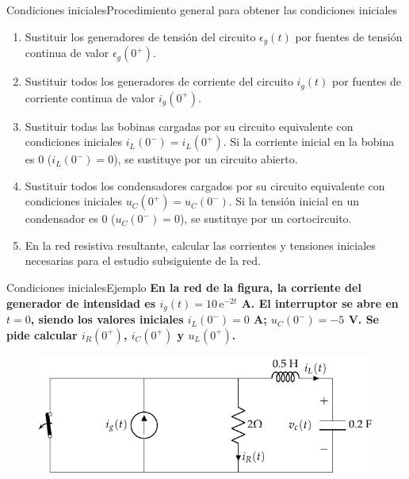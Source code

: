\documentclass[aspectratio=169, xcolor={usenames,svgnames,dvipsnames}]{beamer}
\begin{document}
\begin{frame}{Condiciones iniciales}{Procedimiento general para obtener las condiciones iniciales}

	\begin{enumerate}
		\item Sustituir los generadores de tensión del circuito $\epsilon_g(t)$ por fuentes de tensión continua de valor $\epsilon_g(0^+)$.
		\item Sustituir todos los generadores de corriente del circuito $i_g(t)$ por fuentes de corriente continua de valor $i_g(0^+)$.
		\item Sustituir todas las bobinas cargadas por su circuito equivalente con condiciones iniciales $i_L(0^-)=i_L(0^+)$. Si la corriente inicial en la bobina es 0 ($i_L(0^-)=0$), se sustituye por un circuito abierto.
		\item Sustituir todos los condensadores cargados por su circuito equivalente con condiciones iniciales $u_C(0^+)=u_C(0^-)$. Si la tensión inicial en un condensador es 0 ($u_C(0^-)=0$), se sustituye por un cortocircuito.
		\item En la red resistiva resultante, calcular las corrientes y tensiones iniciales necesarias para el estudio subsiguiente de la red.
	\end{enumerate}
\end{frame}

\begin{frame}{Condiciones iniciales}{Ejemplo}
    \textbf{En la red de la figura, la corriente del generador de intensidad es $i_g(t) = 10\,\mathrm{e}^{-2t}$ A. El interruptor se abre en $t = 0$, siendo los valores iniciales $i_L(0^-) = 0$ A; $u_C(0^-) = -5$ V. Se pide calcular $i_R(0^+)$, $i_C(0^+)$ y $u_L(0^+)$.}
\begin{figure}[H]
    \centering
    \includegraphics{../figs/ej_condiciones_iniciales.pdf}
\end{figure}
\end{frame}
\end{document}
